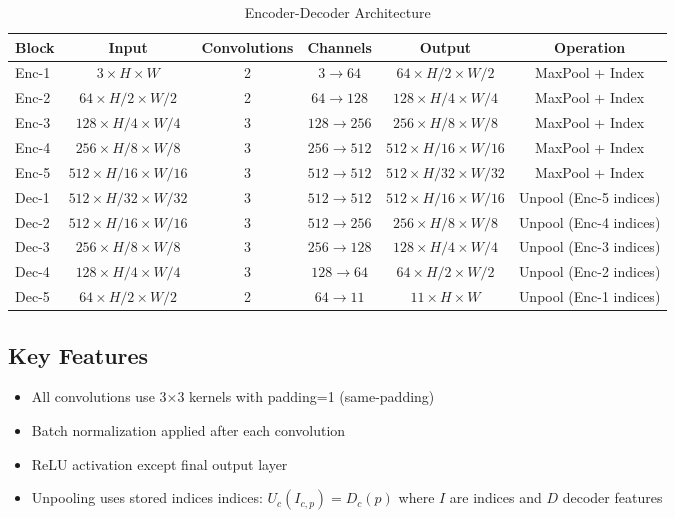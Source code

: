 \documentclass[11pt,a4paper]{report}
\begin{document}
\begin{table}[H]
\centering
\caption{Encoder-Decoder Architecture}
\label{tab:architecture}
\small
\begin{tabular}{lccccc}
\toprule
\rowcolor{tableheader}
\textbf{Block} & \textbf{Input} & \textbf{Convolutions} & \textbf{Channels} & \textbf{Output} & \textbf{Operation} \\
\midrule
Enc-1 & $3 \times H \times W$ & 2 & $3 \to 64$ & $64 \times H/2 \times W/2$ & MaxPool + Index \\
Enc-2 & $64 \times H/2 \times W/2$ & 2 & $64 \to 128$ & $128 \times H/4 \times W/4$ & MaxPool + Index \\
Enc-3 & $128 \times H/4 \times W/4$ & 3 & $128 \to 256$ & $256 \times H/8 \times W/8$ & MaxPool + Index \\
Enc-4 & $256 \times H/8 \times W/8$ & 3 & $256 \to 512$ & $512 \times H/16 \times W/16$ & MaxPool + Index \\
Enc-5 & $512 \times H/16 \times W/16$ & 3 & $512 \to 512$ & $512 \times H/32 \times W/32$ & MaxPool + Index \\
\midrule
Dec-1 & $512 \times H/32 \times W/32$ & 3 & $512 \to 512$ & $512 \times H/16 \times W/16$ & Unpool (Enc-5 indices) \\
Dec-2 & $512 \times H/16 \times W/16$ & 3 & $512 \to 256$ & $256 \times H/8 \times W/8$ & Unpool (Enc-4 indices) \\
Dec-3 & $256 \times H/8 \times W/8$ & 3 & $256 \to 128$ & $128 \times H/4 \times W/4$ & Unpool (Enc-3 indices) \\
Dec-4 & $128 \times H/4 \times W/4$ & 3 & $128 \to 64$ & $64 \times H/2 \times W/2$ & Unpool (Enc-2 indices) \\
Dec-5 & $64 \times H/2 \times W/2$ & 2 & $64 \to 11$ & $11 \times H \times W$ & Unpool (Enc-1 indices) \\
\bottomrule
\end{tabular}
\end{table}

\subsection*{Key Features}
\begin{itemize}
  \item All convolutions use 3×3 kernels with padding=1 (same-padding)
  \item Batch normalization applied after each convolution
  \item ReLU activation except final output layer
  \item Unpooling uses stored indices indices: $U_c(I_{c,p}) = D_c(p)$ where $I$ are indices and $D$ decoder features
\end{itemize}
\end{document}
